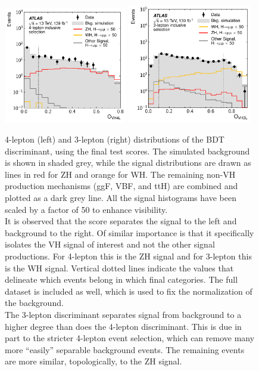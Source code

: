 \begin{figure}[htpb]
  \centering
  \includegraphics[width=0.48\textwidth]{figures/hmm/public/bdt/histo-4lep-bdtScore.pdf}
  \includegraphics[width=0.48\textwidth]{figures/hmm/public/bdt/histo-3lep-bdtScore.pdf}
  \caption{4-lepton (left) and 3-lepton (right) distributions of the BDT discriminant, using the final test scores. The simulated background is shown in shaded grey, while the signal distributions are drawn as lines in red for ZH and orange for WH. The remaining non-VH production mechanisms (ggF, VBF, and ttH) are combined and plotted as a dark grey line. All the signal histograms have been scaled by a factor of 50 to enhance visibility.\\
  It is observed that the score separates the signal to the left and background to the right. Of similar importance is that it specifically isolates the VH signal of interest and not the other signal productions. For 4-lepton this is the ZH signal and for 3-lepton this is the WH signal. Vertical dotted lines indicate the values that delineate which events belong in which final categories. The full dataset is included as well, which is used to fix the normalization of the background. \\
  The 3-lepton discriminant separates signal from background to a higher degree than does the 4-lepton discriminant. This is due in part to the stricter 4-lepton event selection, which can remove many more ``easily'' separable background events. The remaining events are more similar, topologically, to the ZH signal.}
    \label{fig:hmmBdtScore}
\end{figure}

